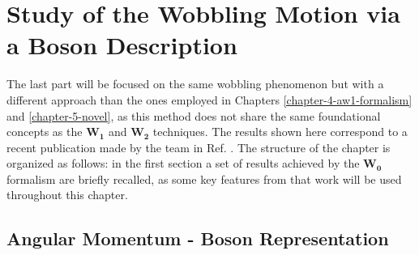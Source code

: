 \chapter{Study of the Wobbling Motion via a Boson Description}
\label{extra-chapter-new-boson}

The last part will be focused on the same wobbling phenomenon but with a different approach than the ones employed in Chapters \ref{chapter-4-aw1-formalism} and \ref{chapter-5-novel}, as this method does not share the same foundational concepts as the $\mathbf{W_1}$ and $\mathbf{W_2}$ techniques. The results shown here correspond to a recent publication made by the team in Ref. \cite{raduta2020new}. The structure of the chapter is organized as follows: in the first section a set of results achieved by the $\mathbf{W_0}$ formalism are briefly recalled, as some key features from that work will be used throughout this chapter. 

\section{Angular Momentum - Boson Representation}
\label{section-intro-boson-representation}


